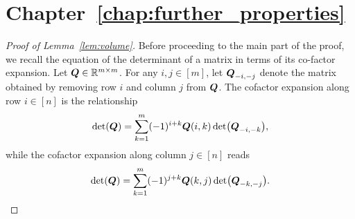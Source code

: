 \section{Chapter~\ref{chap:further_properties}}
\label{sec:app_proofs_further}

\begin{proof}[Proof of Lemma~\ref{lem:volume}]
	Before proceeding to the main part of the proof, we recall the equation of the determinant of a matrix in terms of its co-factor expansion. Let $\vb*{Q}\in\mathbb{R}^{m\times m}$. For any $i,j\in[m]$, let $\vb*{Q}_{-i,-j}$ denote the matrix obtained by removing row $i$ and column $j$ from $\vb*{Q}$. The cofactor expansion along row $i\in[n]$ is the relationship
	\begin{equation*}
	\det(\vb*{Q}) = \sum_{k=1}^m (-1)^{i+k} \vb*{Q}(i,k)\det(\vb*{Q}_{-i,-k}),
	\end{equation*}
	while the cofactor expansion along column $j\in[n]$ reads
	\begin{equation*}
	\det(\vb*{Q}) = \sum_{k=1}^m (-1)^{j+k} \vb*{Q}(k,j)\det(\vb*{Q}_{-k,-j}). 
	\end{equation*}
	

\end{proof}
